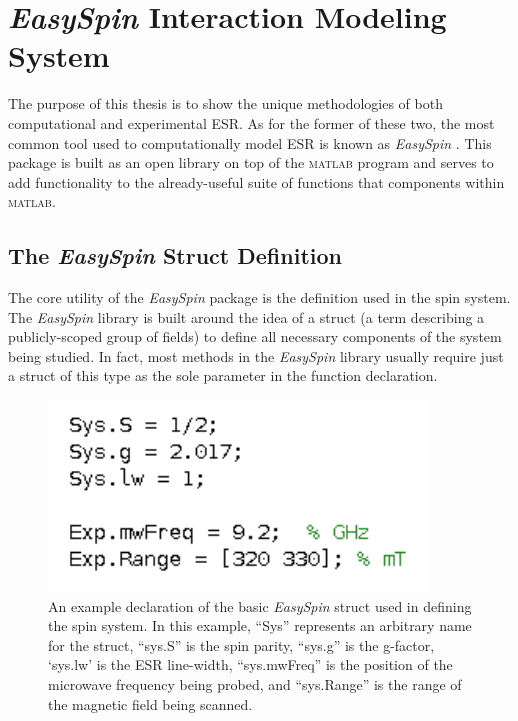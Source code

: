 \documentclass[oneside]{BYUPhys}
\begin{document}
\section{\textit{EasySpin} Interaction Modeling System}

The purpose of this thesis is to show the unique methodologies of both computational and experimental ESR. As for the former of these two, the most common tool used to computationally model ESR is known as \textit{EasySpin} \cite{RefWorks:doc:58929a02e4b0d4c09201f91b}. This package is built as an open library on top of the \textsc{matlab} program and serves to add functionality to the already-useful suite of functions that components within \textsc{matlab}.

\subsection{The \textit{EasySpin} Struct Definition}

The core utility of the \textit{EasySpin} package is the definition used in the spin system. The \textit{EasySpin} library is built around the idea of a struct (a term describing a publicly-scoped group of fields) to define all necessary components of the system being studied. In fact, most methods in the \textit{EasySpin} library usually require just a struct of this type as the sole parameter in the function declaration.

\begin{figure}[h]
    \centerline{\includegraphics{example_params_fig}}
    \caption[Simple Spin System Definition]{\label{fig:SpinDefinition}
     An example declaration of the basic \textit{EasySpin} struct used in defining the spin system. In this example, ``Sys'' represents an arbitrary name for the struct, ``sys.S'' is the spin parity, ``sys.g'' is the g-factor, `sys.lw' is the ESR line-width, ``sys.mwFreq'' is the position of the microwave frequency being probed, and ``sys.Range'' is the range of the magnetic field being scanned.}
 \end{figure}
\end{document}
